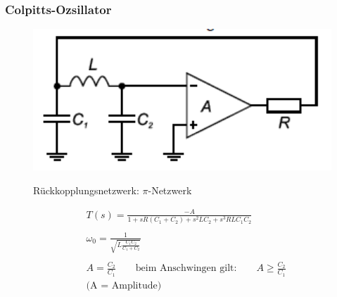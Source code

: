 \subsubsection{Colpitts-Ozsillator}
\begin{figure}[h!]
	\begin{minipage}{0.3\textwidth} 
	\includegraphics[width=1.1\textwidth]{images/Colpitts-Oszillator}
	\end{minipage}
	\begin{minipage}{0.6\textwidth}
      \begin{compactitem}
        \item Rückkopplungsnetzwerk: $\pi$-Netzwerk\\
      \end{compactitem}
      \begin{equation*} 
        \begin{split} 
           &T(s) = \frac{-A}{1+sR(C_1+C_2)+s^2LC_2+s^3RLC_1C_2}\\\\
           &\omega _0 = \frac{1}{\sqrt{L\frac{C_1 C_2}{C_1+C_2}}}\\\\
           &A =\frac{C_2}{C_1} \quad \quad \text{beim Anschwingen gilt:} \quad \quad A \geq\frac{C_2}{C_1} \\
           &\text{(A = Amplitude)} \\\\
        \end{split} 
      \end{equation*}
	\end{minipage}
\end{figure}

\FloatBarrier
